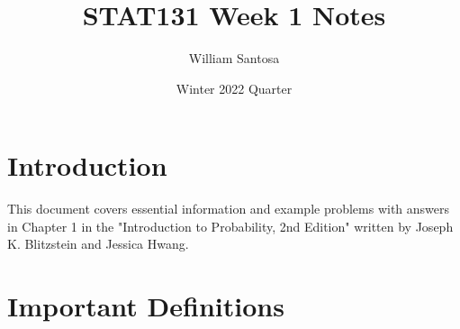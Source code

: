 \documentclass[12pt, letterpaper]{article}
\title{STAT131 Week 1 Notes}
\author{William Santosa}
\date{Winter 2022 Quarter}
\begin{document}
\maketitle

\section{Introduction}
This document covers essential information and example problems with answers in Chapter 1 in the "Introduction to Probability, 2nd Edition" written by Joseph K. Blitzstein and Jessica Hwang.

\section{Important Definitions}
\end{document}
